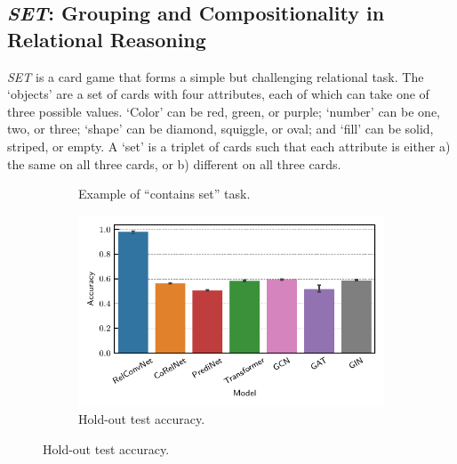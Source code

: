 \subsection{\textit{SET}: Grouping and Compositionality in Relational Reasoning}\label{ssec:experiments_set}

\textit{SET} is a card game that forms a simple but challenging relational task. The `objects' are a set of cards with four attributes, each of which can take one of three possible values. `Color' can be red, green, or purple; `number' can be one, two, or three; `shape' can be diamond, squiggle, or oval; and `fill' can be solid, striped, or empty. A `set' is a triplet of cards such that each attribute is either a) the same on all three cards, or b) different on all three cards.

\begin{figure}[ht]
    \vskip-10pt
    \centering
    \begin{subfigure}[b]{0.49\textwidth}
        \centering
        \caption{Example of ``contains set'' task.}\label{fig:contains_set_example}
    \end{subfigure}
    \begin{subfigure}[b]{0.5\textwidth}
        \centering
        \includegraphics[width=\textwidth]{figs/experiments/contains_set_acc.pdf}
        \vskip-5pt
        \caption{\footnotesize{Hold-out test accuracy.}}\label{fig:contains_set_acc}
    \end{subfigure}


\end{figure}
